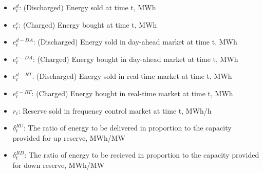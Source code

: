 \documentclass[a4paper,11pt,twoside,onecolumn]{book}
\begin{document}
\begin{itemize}
	\item $e_t^d$: (Discharged) Energy sold at time t, MWh
	\item $e_t^c$: (Charged) Energy bought at time t, MWh
	\item $e_t^{d-DA}$: (Discharged) Energy sold in day-ahead market at time t, MWh
	\item $e_t^{c-DA}$: (Charged) Energy bought  in day-ahead market at time t, MWh
	\item $e_t^{d-RT}$: (Discharged) Energy sold in real-time market at time t, MWh
	\item $e_t^{c-RT}$: (Charged) Energy bought  in real-time market at time t, MWh
	\item $r_t$: Reserve sold in frequency control market at time t, MWh/h
	\item $\delta_t^{RU}$: The ratio of energy to be delivered in proportion to the capacity provided for up reserve, MWh/MW
	\item $\delta_t^{RD}$: The ratio of energy to be recieved in proportion to the capacity provided for down reserve, MWh/MW
	

\end{itemize}
\end{document}

